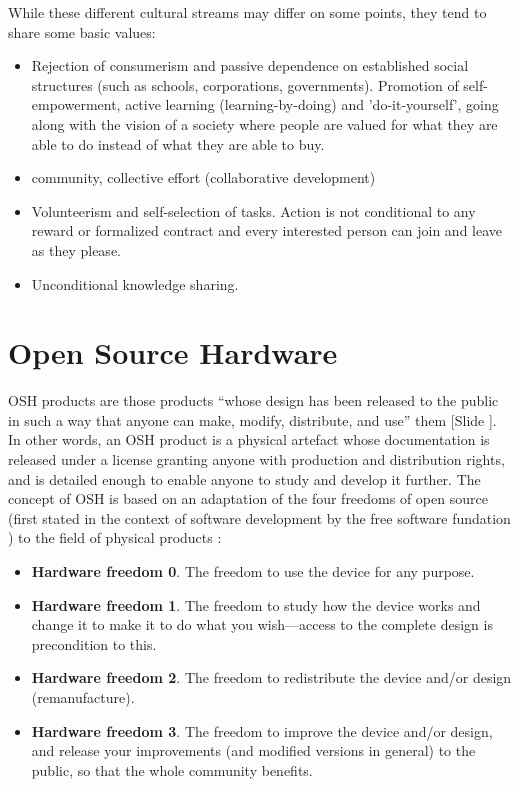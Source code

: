 \documentclass{article}
\newcounter{slide}
\begin{document}
While these different cultural streams may differ on some points, they tend to share some basic values:
\begin{itemize}
	\item Rejection of consumerism and passive dependence on established social structures (such as schools, corporations, governments). Promotion of self-empowerment, active learning (learning-by-doing) and 'do-it-yourself', going along with the vision of a society where people are valued for what they are able to do instead of what they are able to buy. 
	\item community, collective effort (collaborative development)
	\item Volunteerism and self-selection of tasks. Action is not conditional to any reward or formalized contract and every interested person can join and leave as they please.

	\item Unconditional knowledge sharing. 

\end{itemize}


\section{Open Source Hardware}
\label{sec:osh}
OSH products are those products ``whose design has been released to the public in such a way that anyone can make, modify, distribute, and use'' them \cite{opensourcehardwareassociationOpenSourceHardware2016} {\color{blue}[Slide ]}. In other words, an OSH product is a physical artefact whose documentation is released under a license granting anyone with production and distribution rights, and is detailed enough to enable anyone to study and develop it further. The concept of OSH is based on an adaptation of the four freedoms of open source (first stated in the context of software development by the free software fundation \cite{freesoftwarefoundationFreeSoftwareDefinition2015}) to the field of physical products \cite{powellDemocratizingProductionOpen2012}: 
\begin{itemize}
	\item \textbf{Hardware freedom 0}. The freedom to use the device for any purpose.
	\item \textbf{Hardware freedom 1}. The freedom to study how the device works and change it to make it to do what you wish---access to the complete design is precondition to this.
	\item \textbf{Hardware freedom 2}. The freedom to redistribute the device and/or design (remanufacture).
	\item \textbf{Hardware freedom 3}. The freedom to improve the device and/or design, and release your improvements (and modified versions in general) to the public, so that the whole community benefits.
\end{itemize}
\end{document}
